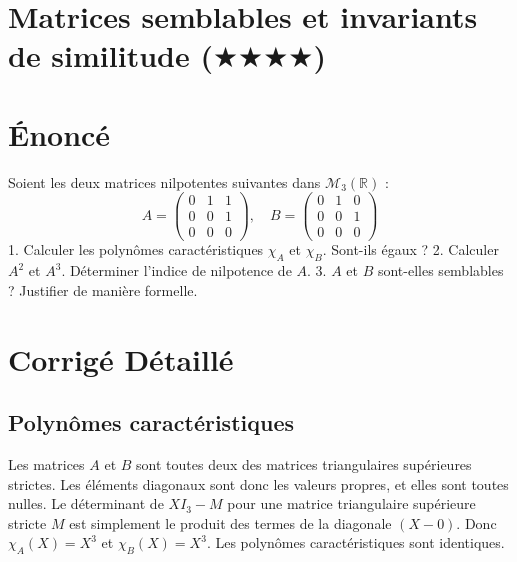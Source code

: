 \documentclass[11pt,a4paper]{article}
\begin{document}
\section{Matrices semblables et invariants de similitude ($\bigstar$$\bigstar$$\bigstar$$\bigstar$)}

\section{Énoncé}
Soient les deux matrices nilpotentes suivantes dans $\mathcal{M}_3(\mathbb{R})$ :
$$A = \begin{pmatrix} 0 & 1 & 1 \\ 0 & 0 & 1 \\ 0 & 0 & 0 \end{pmatrix}, \quad B = \begin{pmatrix} 0 & 1 & 0 \\ 0 & 0 & 1 \\ 0 & 0 & 0 \end{pmatrix}$$
1. Calculer les polynômes caractéristiques $\chi_A$ et $\chi_B$. Sont-ils égaux ?
2. Calculer $A^2$ et $A^3$. Déterminer l'indice de nilpotence de $A$.
3. $A$ et $B$ sont-elles semblables ? Justifier de manière formelle.

\section{Corrigé Détaillé}

\subsection{Polynômes caractéristiques}
Les matrices $A$ et $B$ sont toutes deux des matrices triangulaires supérieures strictes.
Les éléments diagonaux sont donc les valeurs propres, et elles sont toutes nulles.
Le déterminant de $X I_3 - M$ pour une matrice triangulaire supérieure stricte $M$ est simplement le produit des termes de la diagonale $(X - 0)$.
Donc $\chi_A(X) = X^3$ et $\chi_B(X) = X^3$.
Les polynômes caractéristiques sont identiques.
\end{document}
